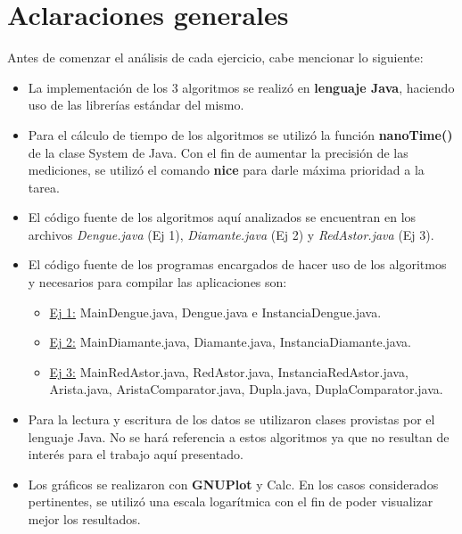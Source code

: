 \documentclass[a4paper,11pt] {article}
\begin{document}
\grupo{}

\maketitle

\bigskip
\section*{Aclaraciones generales}

Antes de comenzar el an\'alisis de cada ejercicio, cabe mencionar lo siguiente:

\begin{itemize}
 \item La implementaci\'on de los 3 algoritmos se realiz\'o en \textbf{lenguaje Java}, haciendo uso de las librer\'ias est\'andar del mismo.
 \item Para el c\'alculo de tiempo de los algoritmos se utiliz\'o la funci\'on \textbf{nanoTime()} de la clase System de Java. Con el fin de aumentar la precisi\'on de las mediciones, se utiliz\'o el comando \textbf{nice} para darle m\'axima prioridad a la tarea.
 \item El c\'odigo fuente de los algoritmos aqu\'i analizados se encuentran en los archivos \textit{Dengue.java} (Ej 1), \textit{Diamante.java} (Ej 2) y \textit{RedAstor.java} (Ej 3).
 \item El c\'odigo fuente de los programas encargados de hacer uso de los algoritmos y necesarios para compilar las aplicaciones son:
 \begin{itemize}
    \item \underline{Ej 1:} MainDengue.java, Dengue.java e InstanciaDengue.java.
    \item \underline{Ej 2:} MainDiamante.java, Diamante.java, InstanciaDiamante.java.
    \item \underline{Ej 3:} MainRedAstor.java, RedAstor.java, InstanciaRedAstor.java, Arista.java, AristaComparator.java, Dupla.java, DuplaComparator.java.
  \end{itemize}
 \item Para la lectura y escritura de los datos se utilizaron clases provistas por el lenguaje Java. No se har\'a referencia a estos algoritmos ya que no resultan de inter\'es para el trabajo aqu\'i presentado.
 \item Los gr\'aficos se realizaron con \textbf{GNUPlot} y Calc. En los casos considerados pertinentes, se utiliz\'o una escala logar\'itmica con el fin de poder visualizar mejor los resultados.
\end{itemize}
\end{document}
